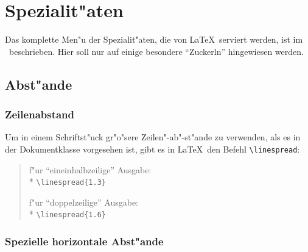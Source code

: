
\section{Spezialit"aten}
 
Das komplette Men"u der Spezialit"aten, die von \LaTeX\ serviert
werden, ist im \manual\ beschrieben.
Hier soll nur auf einige besondere "`Zuckerln"' hingewiesen
werden.
 
\subsection{Abst"ande}

\subsubsection{Zeilenabstand}

Um in einem Schriftst"uck gr"o"sere Zeilen"-ab"-st"ande zu verwenden,
als es in der Dokumentklasse vorgesehen ist, gibt es in
\LaTeX\ den Befehl \verb:\linespread::
\begin{quote}
f"ur "`eineinhalbzeilige"' Ausgabe:\\*
\verb|\linespread{1.3}|
 
f"ur "`doppelzeilige"' Ausgabe:\\*
\verb|\linespread{1.6}|
\end{quote}
 
 
 
\subsubsection{Spezielle horizontale Abst"ande}\label{abst:horiz}
 
